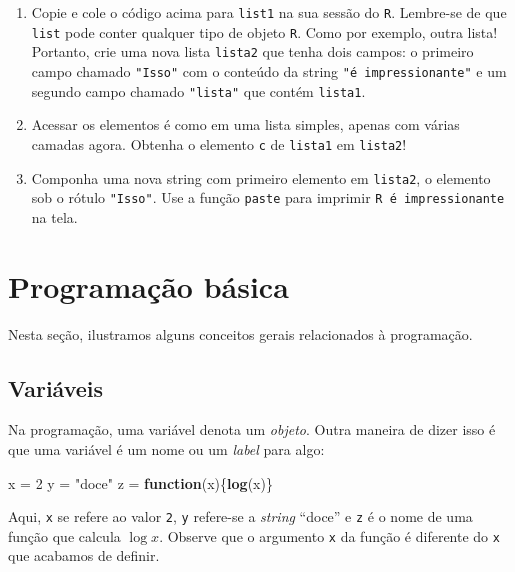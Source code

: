 \documentclass[
]{book}
\newenvironment{Shaded}{\begin{snugshade}}{\end{snugshade}}
\newcommand{\ControlFlowTok}[1]{\textcolor[rgb]{0.13,0.29,0.53}{\textbf{#1}}}
\newcommand{\DecValTok}[1]{\textcolor[rgb]{0.00,0.00,0.81}{#1}}
\newcommand{\KeywordTok}[1]{\textcolor[rgb]{0.13,0.29,0.53}{\textbf{#1}}}
\newcommand{\NormalTok}[1]{#1}
\newcommand{\StringTok}[1]{\textcolor[rgb]{0.31,0.60,0.02}{#1}}
\providecommand{\tightlist}{%
  \setlength{\itemsep}{0pt}\setlength{\parskip}{0pt}}
\theoremstyle{definition}
\theoremstyle{definition}
\theoremstyle{definition}
\theoremstyle{remark}
\begin{document}
\begin{enumerate}
\def\labelenumi{\arabic{enumi}.}
\tightlist
\item
  Copie e cole o código acima para \texttt{list1} na sua sessão do \texttt{R}. Lembre-se de que \texttt{list} pode conter qualquer tipo de objeto \texttt{R}. Como por exemplo, outra lista! Portanto, crie uma nova lista \texttt{lista2} que tenha dois campos: o primeiro campo chamado \texttt{"Isso"} com o conteúdo da string \texttt{"é\ impressionante"} e um segundo campo chamado \texttt{"lista"} que contém \texttt{lista1}.
\item
  Acessar os elementos é como em uma lista simples, apenas com várias camadas agora. Obtenha o elemento \texttt{c} de \texttt{lista1} em \texttt{lista2}!
\item
  Componha uma nova string com primeiro elemento em \texttt{lista2}, o elemento sob o rótulo \texttt{"Isso"}. Use a função \texttt{paste} para imprimir \texttt{R\ é\ impressionante} na tela.
\end{enumerate}

\hypertarget{programauxe7uxe3o-buxe1sica}{%
\section{Programação básica}\label{programauxe7uxe3o-buxe1sica}}

Nesta seção, ilustramos alguns conceitos gerais relacionados à programação.

\hypertarget{variuxe1veis}{%
\subsection{Variáveis}\label{variuxe1veis}}

Na programação, uma variável denota um \emph{objeto}. Outra maneira de dizer isso é que uma variável é um nome ou um \emph{label} para algo:

\begin{Shaded}
\begin{Highlighting}[]
\NormalTok{x =}\StringTok{ }\DecValTok{2}
\NormalTok{y =}\StringTok{ "doce"}
\NormalTok{z =}\StringTok{ }\ControlFlowTok{function}\NormalTok{(x)\{}\KeywordTok{log}\NormalTok{(x)\}}
\end{Highlighting}
\end{Shaded}

Aqui, \texttt{x} se refere ao valor \texttt{2}, \texttt{y} refere-se a \emph{string} ``doce'' e \texttt{z} é o nome de uma função que calcula \(\log{x}\). Observe que o argumento \texttt{x} da função é diferente do \texttt{x} que acabamos de definir.
\end{document}
